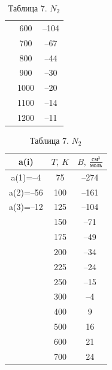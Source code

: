 \documentclass[a4paper]{article}
\numberwithin{equation}{subsection} %
\begin{document}
\begin{table}[ht!]
\begin{minipage}{0.32\linewidth}
\begin{tabular}{|c|c|c|}
           & 600 & –104 \\
           & 700 & –67 \\
           & 800 & –44 \\
           & 900 & –30 \\
           & 1000 & –20 \\
           & 1100 & –14 \\
           & 1200 & –11 \\
\hline
\end{tabular}
\caption{Таблица 6. $H_2O$}
\label{tab:h2o}
\end{minipage}
\hfill
\begin{minipage}{0.32\linewidth}
\centering
\begin{tabular}{|c|c|c|}
\hline
a(i) & $T,\ K$ & $B,\ \frac{\text{см}^3}{\text{моль}}$ \\
\hline
a(1)=–4 & 75 & –274 \\
a(2)=–56 & 100 & –161 \\
a(3)=–12 & 125 & –104 \\
         & 150 & –71 \\
         & 175 & –49 \\
         & 200 & –34 \\
         & 225 & –24 \\
         & 250 & –15 \\
         & 300 & –4 \\
         & 400 & 9 \\
         & 500 & 16 \\
         & 600 & 21 \\
         & 700 & 24 \\
\hline
\end{tabular}
\caption{Таблица 7. $N_2$}
\label{tab:n2}
\end{minipage}
\end{table}

\vspace{1em} %
\end{document}
